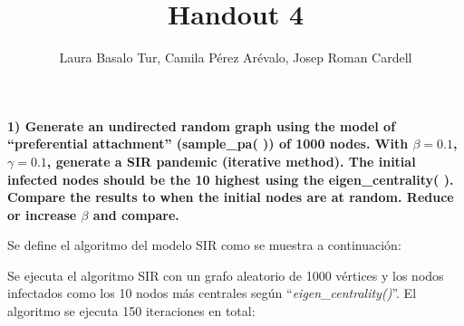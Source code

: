 \documentclass[
]{article}
\title{Handout 4}
\author{Laura Basalo Tur, Camila Pérez Arévalo, Josep Roman Cardell}
\date{}
\newenvironment{Shaded}{\begin{snugshade}}{\end{snugshade}}
\newcommand{\ControlFlowTok}[1]{\textcolor[rgb]{0.13,0.29,0.53}{\textbf{#1}}}
\newcommand{\KeywordTok}[1]{\textcolor[rgb]{0.13,0.29,0.53}{\textbf{#1}}}
\newcommand{\NormalTok}[1]{#1}
\newcommand{\OperatorTok}[1]{\textcolor[rgb]{0.81,0.36,0.00}{\textbf{#1}}}
\newcommand{\StringTok}[1]{\textcolor[rgb]{0.31,0.60,0.02}{#1}}
\begin{document}
\maketitle

\textbf{1) Generate an undirected random graph using the model of
``preferential attachment'' (sample\_pa( )) of 1000 nodes. With
\(\beta=0.1\), \(\gamma=0.1\), generate a SIR pandemic (iterative
method). The initial infected nodes should be the 10 highest using the
eigen\_centrality( ). Compare the results to when the initial nodes are
at random. Reduce or increase \(\beta\) and compare. }

Se define el algoritmo del modelo SIR como se muestra a continuación:

\begin{Shaded}
\end{Shaded}

Se ejecuta el algoritmo SIR con un grafo aleatorio de 1000 vértices y
los nodos infectados como los 10 nodos más centrales según
``\emph{eigen\_centrality()}''. El algoritmo se ejecuta 150 iteraciones
en total:
\end{document}

